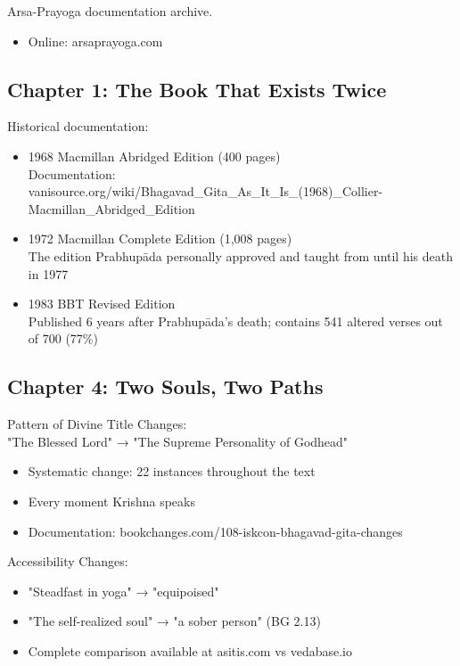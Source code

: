 \documentclass[12pt]{article}
\begin{document}
Arsa-Prayoga documentation archive.
\begin{itemize}
\item Online: arsaprayoga.com
\end{itemize}

\vspace{0.5cm}

\subsection*{Chapter 1: The Book That Exists Twice}

Historical documentation:
\begin{itemize}
\item 1968 Macmillan Abridged Edition (400 pages)\\
  Documentation: vanisource.org/wiki/Bhagavad\_Gita\_As\_It\_Is\_(1968)\_Collier-Macmillan\_Abridged\_Edition
\item 1972 Macmillan Complete Edition (1,008 pages)\\
  The edition Prabhupāda personally approved and taught from until his death in 1977
\item 1983 BBT Revised Edition\\
  Published 6 years after Prabhupāda's death; contains 541 altered verses out of 700 (77\%)
\end{itemize}

\vspace{0.5cm}

\subsection*{Chapter 4: Two Souls, Two Paths}

Pattern of Divine Title Changes:\\
"The Blessed Lord" → "The Supreme Personality of Godhead"
\begin{itemize}
\item Systematic change: 22 instances throughout the text
\item Every moment Krishna speaks
\item Documentation: bookchanges.com/108-iskcon-bhagavad-gita-changes
\end{itemize}

Accessibility Changes:
\begin{itemize}
\item "Steadfast in yoga" → "equipoised"
\item "The self-realized soul" → "a sober person" (BG 2.13)
\item Complete comparison available at asitis.com vs vedabase.io
\end{itemize}
\end{document}
